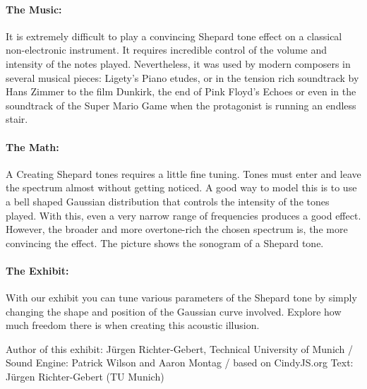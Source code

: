 \paragraph{The Music:} It is extremely difficult to play a convincing Shepard tone effect on a classical non-electronic instrument. It requires incredible control of the volume and intensity of the notes played. Nevertheless, it was used by modern composers in several musical pieces: Ligety's Piano etudes, or in the tension rich soundtrack by Hans Zimmer to the film Dunkirk, the end of Pink Floyd's Echoes or even in the soundtrack of the Super Mario Game when the protagonist is running an endless stair.

\paragraph{The Math:} A Creating Shepard tones requires a little fine tuning. Tones must enter and leave the spectrum almost without getting noticed. A good way to model this is to use a bell shaped Gaussian distribution that controls the intensity of the tones played. With this, even a very narrow range of frequencies produces a good effect. However, the broader and more overtone-rich the chosen spectrum is, the more convincing the effect. The picture shows the sonogram of a Shepard tone.

\paragraph{The Exhibit:} With our exhibit you can tune various parameters of the Shepard tone by simply changing the shape and position of the Gaussian curve involved. Explore how much freedom there is when creating this acoustic illusion.

\vfill

Author of this exhibit: Jürgen Richter-Gebert, Technical University of Munich / Sound Engine: Patrick Wilson and Aaron Montag / based on CindyJS.org
Text: Jürgen Richter-Gebert (TU Munich)\\
